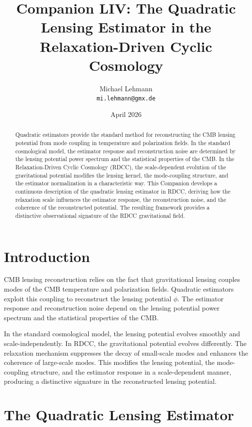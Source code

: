 \documentclass[11pt,a4paper]{article}
\title{\textbf{Companion LIV: The Quadratic Lensing Estimator in the Relaxation-Driven Cyclic Cosmology}}
\author{Michael Lehmann \\ \texttt{mi.lehmann@gmx.de}}
\date{April 2026}
\begin{document}
\maketitle

\begin{abstract}
Quadratic estimators provide the standard method for reconstructing the CMB lensing 
potential from mode coupling in temperature and polarization fields. In the 
standard cosmological model, the estimator response and reconstruction noise are 
determined by the lensing potential power spectrum and the statistical properties 
of the CMB. In the Relaxation-Driven Cyclic Cosmology (RDCC), the scale-dependent 
evolution of the gravitational potential modifies the lensing kernel, the 
mode-coupling structure, and the estimator normalization in a characteristic way. 
This Companion develops a continuous description of the quadratic lensing estimator 
in RDCC, deriving how the relaxation scale influences the estimator response, the 
reconstruction noise, and the coherence of the reconstructed potential. The 
resulting framework provides a distinctive observational signature of the RDCC 
gravitational field.
\end{abstract}
\section{Introduction}

CMB lensing reconstruction relies on the fact that gravitational lensing couples 
modes of the CMB temperature and polarization fields. Quadratic estimators exploit 
this coupling to reconstruct the lensing potential $\phi$. The estimator response 
and reconstruction noise depend on the lensing potential power spectrum and the 
statistical properties of the CMB.

In the standard cosmological model, the lensing potential evolves smoothly and 
scale-independently. In RDCC, the gravitational potential evolves differently. The 
relaxation mechanism suppresses the decay of small-scale modes and enhances the 
coherence of large-scale modes. This modifies the lensing potential, the 
mode-coupling structure, and the estimator response in a scale-dependent manner, 
producing a distinctive signature in the reconstructed lensing potential.
\section{The Quadratic Lensing Estimator}
\end{document}
